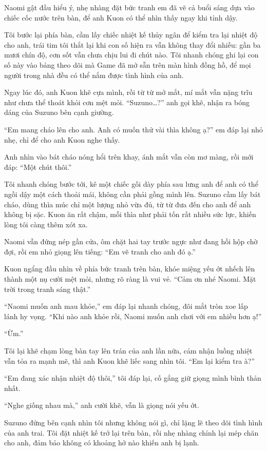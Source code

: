 \documentclass[../main.tex]{subfiles}
\begin{document}
Naomi gật đầu hiểu ý, nhẹ nhàng đặt bức tranh em đã vẽ cả buổi sáng dựa vào chiếc cốc nước trên bàn, để anh Kuon có thể nhìn thấy ngay khi tỉnh dậy. 

Tôi bước lại phía bàn, cầm lấy chiếc nhiệt kế thủy ngân để kiểm tra lại nhiệt độ cho anh, trái tim tôi thắt lại khi con số hiện ra vẫn không thay đổi nhiều: gần ba mươi chín độ, cơn sốt vẫn chưa chịu lui đi chút nào. Tôi nhanh chóng ghi lại con số này vào bảng theo dõi mà Game đã mở sẵn trên màn hình đồng hồ, để mọi người trong nhà đều có thể nắm được tình hình của anh.

Ngay lúc đó, anh Kuon khẽ cựa mình, rồi từ từ mở mắt, mí mắt vẫn nặng trĩu như chưa thể thoát khỏi cơn mệt mỏi. ``Suzuno\dots?'' anh gọi khẽ, nhận ra bóng dáng của Suzuno bên cạnh giường.

``Em mang cháo lên cho anh. Anh có muốn thử vài thìa không ạ?'' em đáp lại nhỏ nhẹ, chỉ để cho anh Kuon nghe thấy.

Anh nhìn vào bát cháo nóng hổi trên khay, ánh mắt vẫn còn mơ màng, rồi mới đáp: ``Một chút thôi.''

Tôi nhanh chóng bước tới, kê một chiếc gối dày phía sau lưng anh để anh có thể ngồi dậy một cách thoải mái, không cần phải gồng mình lên. Suzuno cầm lấy bát cháo, dùng thìa múc chỉ một lượng nhỏ vừa đủ, từ từ đưa đến cho anh để anh không bị sặc. Kuon ăn rất chậm, mỗi thìa như phải tốn rất nhiều sức lực, khiến lòng tôi càng thêm xót xa.

Naomi vẫn đứng nép gần cửa, ôm chặt hai tay trước ngực như đang hồi hộp chờ đợi, rồi em nhỏ giọng lên tiếng: ``Em vẽ tranh cho anh đó ạ.''

Kuon ngẩng đầu nhìn về phía bức tranh trên bàn, khóe miệng yếu ớt nhếch lên thành một nụ cười mệt mỏi, nhưng rõ ràng là vui vẻ. ``Cảm ơn nhé Naomi. Mặt trời trong tranh sáng thật.''

``Naomi muốn anh mau khỏe,'' em đáp lại nhanh chóng, đôi mắt tròn xoe lấp lánh hy vọng. ``Khi nào anh khỏe rồi, Naomi muốn anh chơi với em nhiều hơn ạ!''

``Ừm.''

Tôi lại khẽ chạm lòng bàn tay lên trán của anh lần nữa, cảm nhận luồng nhiệt vẫn tỏa ra mạnh mẽ, thì anh Kuon khẽ liếc sang nhìn tôi. ``Em lại kiểm tra à?''

``Em đang xác nhận nhiệt độ thôi,'' tôi đáp lại, cố gắng giữ giọng mình bình thản nhất.

``Nghe giống nhau mà,'' anh cười khẽ, vẫn là giọng nói yếu ớt.

Suzuno đứng bên cạnh nhìn tôi nhưng không nói gì, chỉ lặng lẽ theo dõi tình hình của anh trai. Tôi đặt nhiệt kế trở lại trên bàn, rồi nhẹ nhàng chỉnh lại mép chăn cho anh, đảm bảo không có khoảng hở nào khiến anh bị lạnh. 
\end{document}

